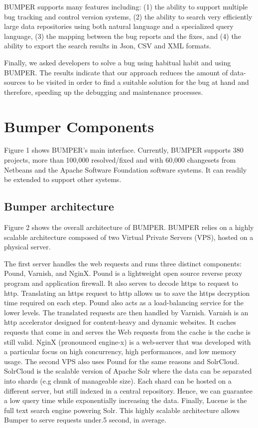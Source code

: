 \documentclass[conference]{IEEEtran}
\begin{document}
BUMPER supports many features including: (1) the ability to support multiple bug tracking and control version systems, (2) the ability to search very efficiently large data repositories using both natural language and a specialized query language, (3) the mapping between the bug reports and the fixes, and (4) the ability to export the search results in Json, CSV and XML formats.

Finally, we asked developers to solve a bug using habitual habit and using BUMPER. The results indicate that our approach reduces the amount of data-sources to be visited in order to find a suitable solution for the bug at hand and therefore, speeding up the debugging and maintenance processes.

\section{Bumper Components}
\label{sec:Bumper Components}

Figure 1 shows BUMPER’s main interface. Currently, BUMPER supports 380 projects, more than 100,000 resolved/fixed and with 60,000 changesets from Netbeans and the Apache Software Foundation software systems. It can readily be extended to support other systems. 







\subsection{Bumper architecture}
\label{sub:Bumper architecture}

Figure 2 shows the overall architecture of BUMPER. BUMPER relies on a highly scalable architecture composed of two Virtual Private Servers (VPS), hosted on a physical server. 





The first server handles the web requests and
runs three distinct components: Pound, Varnish, and NginX.
Pound is a lightweight open source reverse proxy program
and application firewall.
It also serves to decode https to request to http.
Translating an https request to http allows us to save the https decryption time required on each step.
Pound also acts as a load-balancing service for the lower levels.
The translated requests are then handled by Varnish.
Varnish is an http accelerator designed for content-heavy and dynamic websites.
It caches requests that come in and serves the Web requests from the cache is the cache is still valid.
NginX (pronounced engine-x) is a web-server that was developed with a particular focus on high concurrency, high performances, and low memory usage.
The second VPS also uses Pound for the same reasons and SolrCloud.
SolrCloud is the scalable version of Apache Solr where the data can be separated into shards (e.g chunk of manageable size).
Each shard can be hosted on a different server, but still indexed in a central repository.
Hence, we can guarantee a low query time while exponentially increasing the data.
Finally, Lucene is the full text search engine powering Solr.
This highly scalable architecture allows Bumper to serve requests under.5 second, in average.
\end{document}
